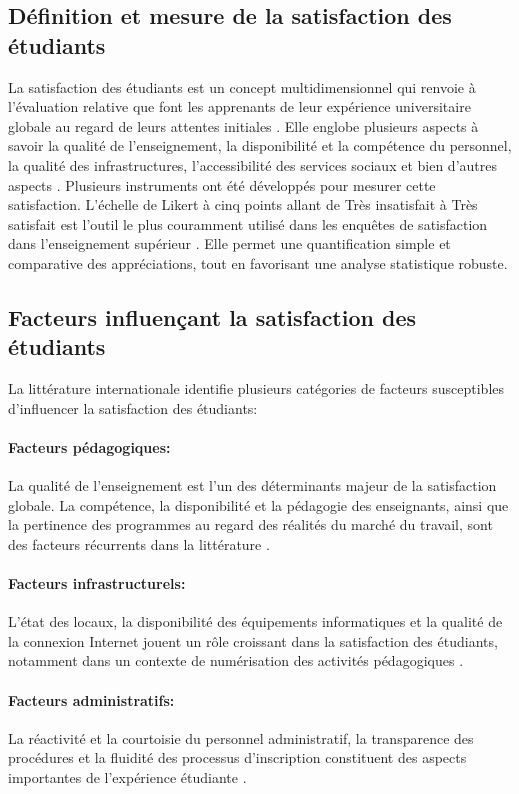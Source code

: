 \documentclass[
12pt,          %
a4paper,       %
oneside,      %
openright      %
]{report}          %
\begin{document}
		\subsection{Définition et mesure de la satisfaction des étudiants}
		La satisfaction des étudiants est un concept multidimensionnel qui renvoie à l'évaluation
		relative que font les apprenants de leur expérience universitaire globale au regard de
		leurs attentes initiales \citep{oliver1980}.
		 Elle englobe plusieurs aspects à savoir
		la qualité de l'enseignement, la disponibilité et la compétence du personnel, la qualité
		des infrastructures, l'accessibilité des services sociaux et bien d'autres aspects 
		\citep{pascarella1991how}.
		Plusieurs instruments ont été développés pour mesurer cette satisfaction. L'échelle de
		Likert à cinq points allant de \og{}Très insatisfait\fg{} à \og{}Très satisfait\fg{}
		est l'outil le plus couramment utilisé dans les enquêtes de satisfaction dans l'enseignement
		supérieur \citep{hill1995measuring}. 
		Elle permet une quantification simple et comparative
		des appréciations, tout en favorisant une analyse statistique robuste.
		
		\subsection{Facteurs influençant la satisfaction des étudiants}
		La littérature internationale identifie plusieurs catégories de facteurs susceptibles
		d'influencer la satisfaction des étudiants:
		\paragraph{Facteurs pédagogiques:} La qualité de l'enseignement est l'un des déterminants
		majeur de la satisfaction globale. La compétence, la disponibilité et la
		pédagogie des enseignants, ainsi que la pertinence des programmes au regard des réalités
		du marché du travail, sont des facteurs récurrents dans la littérature
		\citep{aldridge1998, wiers2002student}.
		\paragraph{Facteurs infrastructurels:} L'état des locaux, la disponibilité des équipements
		informatiques et la qualité de la connexion Internet jouent un rôle croissant dans la
		satisfaction des étudiants, notamment dans un contexte de numérisation des activités
		pédagogiques 
		\citep{wilkins2013}.
		\paragraph{Facteurs administratifs:} La réactivité et la courtoisie du personnel
		administratif, la transparence des procédures et la fluidité des processus d'inscription
		constituent des aspects importantes de l'expérience étudiante \citep{elliott2002}.
\end{document}
